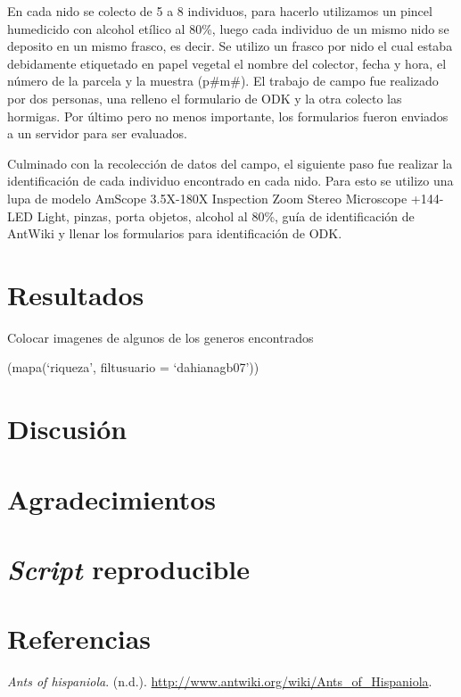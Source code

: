 \documentclass[11pt,]{article}
\begin{document}
En cada nido se colecto de 5 a 8 individuos, para hacerlo utilizamos un
pincel humedicido con alcohol etílico al 80\%, luego cada individuo de
un mismo nido se deposito en un mismo frasco, es decir. Se utilizo un
frasco por nido el cual estaba debidamente etiquetado en papel vegetal
el nombre del colector, fecha y hora, el número de la parcela y la
muestra (p\#m\#). El trabajo de campo fue realizado por dos personas,
una relleno el formulario de ODK y la otra colecto las hormigas. Por
último pero no menos importante, los formularios fueron enviados a un
servidor para ser evaluados.

Culminado con la recolección de datos del campo, el siguiente paso fue
realizar la identificación de cada individuo encontrado en cada nido.
Para esto se utilizo una lupa de modelo AmScope 3.5X-180X Inspection
Zoom Stereo Microscope +144-LED Light, pinzas, porta objetos, alcohol al
80\%, guía de identificación de AntWiki y llenar los formularios para
identificación de ODK.

\section{Resultados}\label{resultados}

Colocar imagenes de algunos de los generos encontrados

(mapa(`riqueza', filtusuario = `dahianagb07'))

\section{Discusión}\label{discusiuxf3n}

\section{Agradecimientos}\label{agradecimientos}

\section{\texorpdfstring{\emph{Script}
reproducible}{Script reproducible}}\label{script-reproducible}

\section*{Referencias}\label{referencias}

\hypertarget{refs}{}
\hypertarget{ref-AntWiki}{}
\emph{Ants of hispaniola}. (n.d.).
\url{http://www.antwiki.org/wiki/Ants_of_Hispaniola}.
\end{document}
